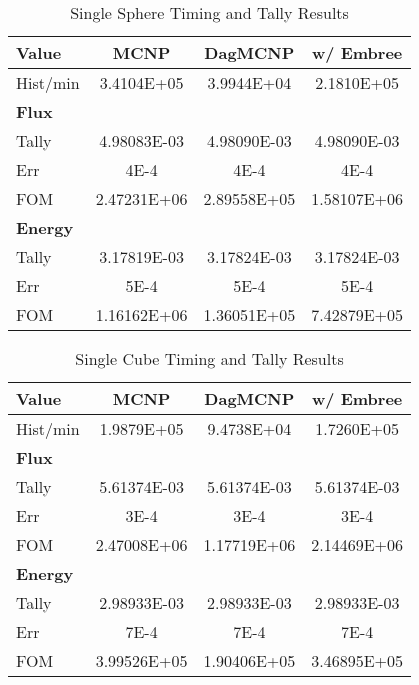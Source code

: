 \documentclass{anstrans}
\begin{document}
\begin{table}[h]

  \begin{center}
    \caption{Single Sphere Timing and Tally Results}

    \begin{tabular}{lccc}
      \toprule
      Value & MCNP & DagMCNP & w/ Embree \\
      \toprule
      Hist/min & 3.4104E+05  & 3.9944E+04  & 2.1810E+05  \\
      \hline
      \textbf{Flux} & & & \\
      \hline
      Tally & 4.98083E-03 & 4.98090E-03 & 4.98090E-03 \\
      Err & 4E-4 & 4E-4 & 4E-4  \\
      FOM & 2.47231E+06 & 2.89558E+05 & 1.58107E+06 \\
      \hline
      \textbf{Energy} & & & \\
      \hline
      Tally & 3.17819E-03 & 3.17824E-03 & 3.17824E-03 \\
      Err & 5E-4 & 5E-4 & 5E-4 \\
      FOM & 1.16162E+06 & 1.36051E+05 & 7.42879E+05 \\      
      \bottomrule
                        
    \end{tabular}


  \end{center}

\end{table}


\begin{table}[h]

  \begin{center}
    \caption{Single Cube Timing and Tally Results}

    \begin{tabular}{lccc}
     \toprule
      Value & MCNP & DagMCNP & w/ Embree \\
     \toprule
     Hist/min & 1.9879E+05 & 9.4738E+04 & 1.7260E+05  \\
     \hline
     \textbf{Flux} & & & \\
     \hline
     Tally & 5.61374E-03 & 5.61374E-03 & 5.61374E-03 \\
     Err & 3E-4 & 3E-4 & 3E-4  \\
     FOM & 2.47008E+06 & 1.17719E+06 & 2.14469E+06 \\
     \hline
     \textbf{Energy} & & & \\
     \hline
     Tally & 2.98933E-03 & 2.98933E-03 & 2.98933E-03 \\
     Err & 7E-4 & 7E-4 & 7E-4 \\
     FOM & 3.99526E+05 & 1.90406E+05 & 3.46895E+05 \\
     \bottomrule
     
    \end{tabular}


  \end{center}

\end{table}
\end{document}
